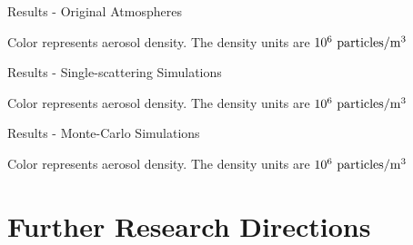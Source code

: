 \documentclass[compress,red,12pt]{beamer}
\begin{document}

\begin{frame}{Results - Original Atmospheres}
  \begin{center}
    \centerline{\def\svgwidth{1.15\linewidth}\footnotesize{}}
  \end{center}
  \begin{center}
    \tiny{Color represents aerosol density. The density units are $10^{6}~{\rm particles}/{\rm m}^3$}
  \end{center}
\end{frame}


\begin{frame}{Results - Single-scattering Simulations}
  \begin{center}
    \centerline{\def\svgwidth{1.15\linewidth}\footnotesize{}}
  \end{center}
  \begin{center}
    \tiny{Color represents aerosol density. The density units are $10^{6}~{\rm particles}/{\rm m}^3$}
  \end{center}
\end{frame}


\begin{frame}{Results - Monte-Carlo Simulations}
  \begin{center}
    \centerline{\def\svgwidth{1.15\linewidth}\footnotesize{}}
  \end{center}
  \begin{center}
    \tiny{Color represents aerosol density. The density units are $10^{6}~{\rm particles}/{\rm m}^3$}
  \end{center}
\end{frame}


\section{Further Research Directions}

\end{document}
